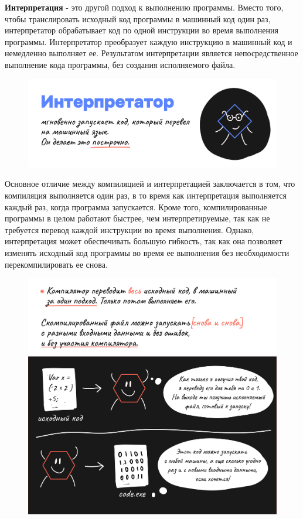 \textbf{Интерпретация} - это другой подход к выполнению программы. Вместо того, чтобы транслировать исходный код программы в машинный код один раз, интерпретатор обрабатывает код по одной инструкции во время выполнения программы. Интерпретатор преобразует каждую инструкцию в машинный код и немедленно выполняет ее. Результатом интерпретации является непосредственное выполнение кода программы, без создания исполняемого файла.

\begin{figure}[h!]\center
  \includegraphics[width=0.8\linewidth]{images/pic1-4.png}
\end{figure}

Основное отличие между компиляцией и интерпретацией заключается в том, что компиляция выполняется один раз, в то время как интерпретация выполняется каждый раз, когда программа запускается. Кроме того, компилированные программы в целом работают быстрее, чем интерпретируемые, так как не требуется перевод каждой инструкции во время выполнения. Однако, интерпретация может обеспечивать большую гибкость, так как она позволяет изменять исходный код программы во время ее выполнения без необходимости перекомпилировать ее снова.

\begin{figure}[h!]\center
  \includegraphics[width=0.9\linewidth]{images/pic1-5.png}
\end{figure}

